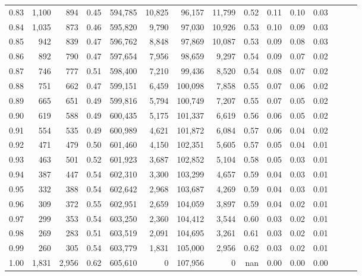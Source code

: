 \begin{tabular}{rrrrrrrrrrrrrrr}
0.83 &   1,100 &    894 &  0.45 &  594,785 &   10,825 &   96,157 &   11,799 &  0.52 &  0.11 &  0.10 &      0.03 \\
0.84 &   1,035 &    873 &  0.46 &  595,820 &    9,790 &   97,030 &   10,926 &  0.53 &  0.10 &  0.09 &      0.03 \\
0.85 &     942 &    839 &  0.47 &  596,762 &    8,848 &   97,869 &   10,087 &  0.53 &  0.09 &  0.08 &      0.03 \\
0.86 &     892 &    790 &  0.47 &  597,654 &    7,956 &   98,659 &    9,297 &  0.54 &  0.09 &  0.07 &      0.02 \\
0.87 &     746 &    777 &  0.51 &  598,400 &    7,210 &   99,436 &    8,520 &  0.54 &  0.08 &  0.07 &      0.02 \\
0.88 &     751 &    662 &  0.47 &  599,151 &    6,459 &  100,098 &    7,858 &  0.55 &  0.07 &  0.06 &      0.02 \\
0.89 &     665 &    651 &  0.49 &  599,816 &    5,794 &  100,749 &    7,207 &  0.55 &  0.07 &  0.05 &      0.02 \\
0.90 &     619 &    588 &  0.49 &  600,435 &    5,175 &  101,337 &    6,619 &  0.56 &  0.06 &  0.05 &      0.02 \\
0.91 &     554 &    535 &  0.49 &  600,989 &    4,621 &  101,872 &    6,084 &  0.57 &  0.06 &  0.04 &      0.02 \\
0.92 &     471 &    479 &  0.50 &  601,460 &    4,150 &  102,351 &    5,605 &  0.57 &  0.05 &  0.04 &      0.01 \\
0.93 &     463 &    501 &  0.52 &  601,923 &    3,687 &  102,852 &    5,104 &  0.58 &  0.05 &  0.03 &      0.01 \\
0.94 &     387 &    447 &  0.54 &  602,310 &    3,300 &  103,299 &    4,657 &  0.59 &  0.04 &  0.03 &      0.01 \\
0.95 &     332 &    388 &  0.54 &  602,642 &    2,968 &  103,687 &    4,269 &  0.59 &  0.04 &  0.03 &      0.01 \\
0.96 &     309 &    372 &  0.55 &  602,951 &    2,659 &  104,059 &    3,897 &  0.59 &  0.04 &  0.02 &      0.01 \\
0.97 &     299 &    353 &  0.54 &  603,250 &    2,360 &  104,412 &    3,544 &  0.60 &  0.03 &  0.02 &      0.01 \\
0.98 &     269 &    283 &  0.51 &  603,519 &    2,091 &  104,695 &    3,261 &  0.61 &  0.03 &  0.02 &      0.01 \\
0.99 &     260 &    305 &  0.54 &  603,779 &    1,831 &  105,000 &    2,956 &  0.62 &  0.03 &  0.02 &      0.01 \\
1.00 &   1,831 &  2,956 &  0.62 &  605,610 &        0 &  107,956 &        0 &   nan &  0.00 &  0.00 &      0.00 \\
\bottomrule
\end{tabular}
